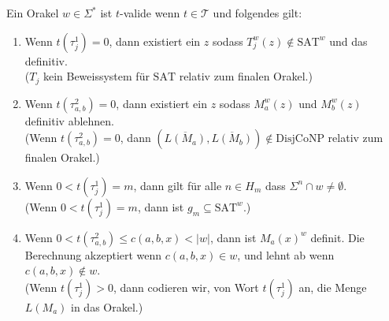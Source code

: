 \documentclass[nofonts]{uebung}
\def\DisjCoNP{\ensuremath{\mathrm{DisjCoNP}}}
\def\SAT{\ensuremath{\mathrm{SAT}}}
\begin{document}
Ein Orakel $w\in\Sigma^*$ ist $t$-valide wenn $t\in\mathcal T$ und folgendes gilt:
\begin{enumerate}[label={V\arabic*}]
    \item Wenn $t(\tau^1_{j})=0$, dann existiert ein $z$ sodass $T_j^w(z)\not\in \SAT^w$ und das definitiv.\\
        ($T_j$ kein Beweissystem für \SAT{} relativ zum finalen Orakel.)
    \item Wenn $t(\tau^2_{a,b})=0$, dann existiert ein $z$ sodass $M_a^w(z)$ und $M_b^w(z)$ definitiv ablehnen.\\
        (Wenn $t(\tau^2_{a,b})=0$, dann $(\overline{L(M_a)}, \overline{ L(M_b)})\not\in \DisjCoNP$ relativ zum finalen Orakel.)
    \item Wenn $0<t(\tau^1_{j})=m$, dann gilt für alle $n\in H_m$ dass $\Sigma^n\cap w\neq \emptyset$.\\
        (Wenn $0<t(\tau^1_{j})=m$, dann ist $g_m\subseteq \SAT^w$.)
    \item Wenn $0<t(\tau^2_{a,b})\leq c(a,b,x)<|w|$, dann ist $M_a(x)^w$ definit. Die Berechnung akzeptiert wenn $c(a,b,x)\in w$, und lehnt ab wenn $c(a,b,x)\not\in w$.\\
        (Wenn $t(\tau^1_{j})>0$, dann codieren wir, von Wort $t(\tau^1_{j})$ an, die Menge $L(M_a)$ in das Orakel.)
\end{enumerate}
\end{document}
